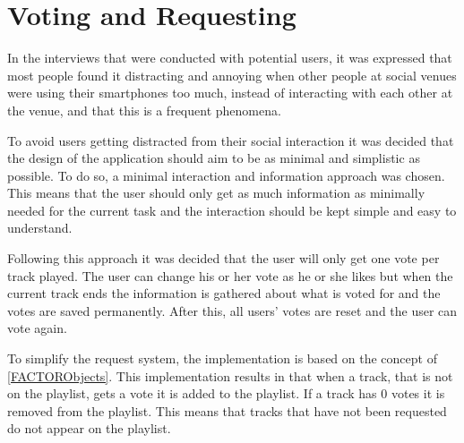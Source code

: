 \section{Voting and Requesting}
\label{VotingAndRequesting}
In the interviews that were conducted with potential users, it was expressed that most people found it distracting and annoying when other people at social venues were using their smartphones too much, instead of interacting with each other at the venue, and that this is a frequent phenomena.

To avoid users getting distracted from their social interaction it was decided that the design of the application should aim to be as minimal and simplistic as possible. To do so, a minimal interaction and information approach was chosen. This means that the user should only get as much information as minimally needed for the current task and the interaction should be kept simple and easy to understand.

Following this approach it was decided that the user will only get one vote per track played. The user can change his or her vote as he or she likes but when the current track ends the information is gathered about what is voted for and the votes are saved permanently. After this, all users' votes are reset and the user can vote again.

To simplify the request system, the implementation is based on the concept of \cref{FACTORObjects}. This implementation results in that when a track, that is not on the playlist, gets a vote it is added to the playlist. If a track has 0 votes it is removed from the playlist. This means that tracks that have not been requested do not appear on the playlist.